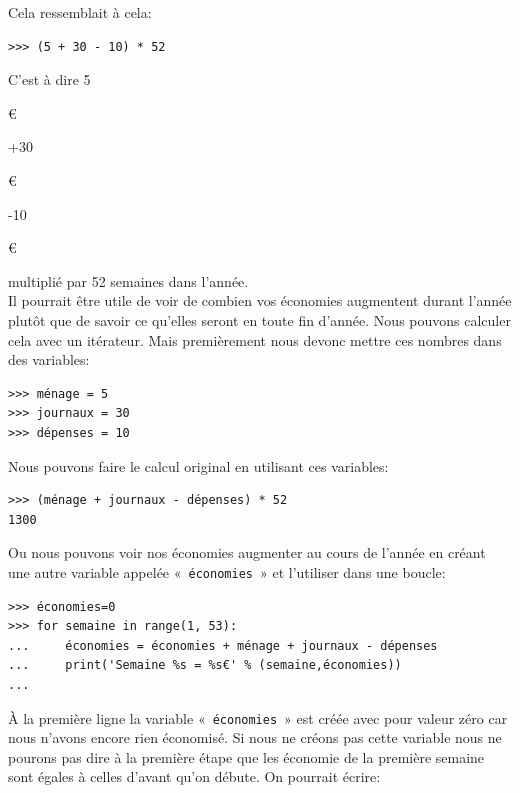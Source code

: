 Cela ressemblait à cela:

\begin{Verbatim}[frame=single,rulecolor=\color{gray}, label=ne pas saisir]
>>> (5 + 30 - 10) * 52
\end{Verbatim}

C'est à dire 5\begin{small}\euro\end{small}+30\begin{small}\euro\end{small}-10\begin{small}\euro\end{small} multiplié par 52 semaines dans l'année.\\

Il pourrait être utile de voir de combien vos économies augmentent durant l'année plutôt que de savoir ce qu'elles seront en toute fin d'année. Nous pouvons calculer cela avec un itérateur. Mais premièrement nous devonc mettre ces nombres dans des variables:

\begin{Verbatim}[frame=single,rulecolor=\color{mbleu}, label=à taper]
>>> ménage = 5
>>> journaux = 30
>>> dépenses = 10
\end{Verbatim}

Nous pouvons faire le calcul original en utilisant ces variables:

\begin{Verbatim}[frame=single,rulecolor=\color{mbleu}, label=à taper]
>>> (ménage + journaux - dépenses) * 52
1300
\end{Verbatim}

Ou nous pouvons voir nos économies augmenter au cours de l'année en créant une autre variable appelée «~\texttt{économies}~» et l'utiliser dans une boucle:

\begin{Verbatim}[frame=single,rulecolor=\color{mbleu}, label=à taper]
>>> économies=0
>>> for semaine in range(1, 53):
...     économies = économies + ménage + journaux - dépenses
...     print('Semaine %s = %s€' % (semaine,économies))
... 
\end{Verbatim}

À la première ligne la variable «~\texttt{économies}~» est créée avec pour valeur zéro car nous n'avons encore
rien économisé. Si nous ne créons pas cette variable nous ne pourons pas dire à la première étape que les économie de la première semaine sont égales à celles d'avant qu'on débute. On pourrait écrire:

